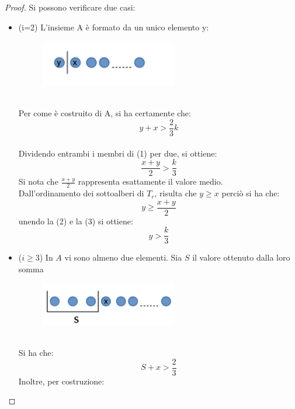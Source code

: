 \begin{proof}
	Si possono verificare  due casi:
	\begin{itemize}
		\item (i=2)  L'insieme A \`e formato da un unico elemento y:
		\begin{figure}[htbp]
			\centering
			\includegraphics[width=6cm]{capitolo3/4}
			\caption{}
		\end{figure}\\
		Per come \`e costruito di A, si ha certamente che:
		\\
		\begin{equation}
			y + x > \frac{2}{3}k
		\end{equation}
		\\
		Dividendo entrambi i membri di (1) per  due, si ottiene:
		\\
		\begin{equation}
			\frac{ x + y }{2} > \frac{k}{3}  
		\end{equation}
		Si nota che $\frac{ x + y }{2} $ rappresenta esattamente il valore medio. \\
		Dall'ordinamento dei sottoalberi di $T_r$, risulta che $y \ge x$ perci\`o si ha che:
		\begin{equation}
			y \ge \frac{ x + y }{2} 
		\end{equation}
		unendo la (2) e la (3)  si ottiene:
		\begin{equation*}
			y > \frac{k}{3}  
		\end{equation*}
		\item ($i\ge3$) In $ A $ vi sono almeno due elementi. Sia $ S $ il valore ottenuto dalla loro somma 
		\begin{figure}[htbp]
			\centering
			\includegraphics[width=6cm]{capitolo3/5}
			\caption{}
		\end{figure}\\
		Si ha che:
		\begin{equation}
			S + x > \frac{2}{3}
		\end{equation}
		Inoltre, per costruzione:
		\begin{equation}

\end{equation}
\end{itemize}
\end{proof}
